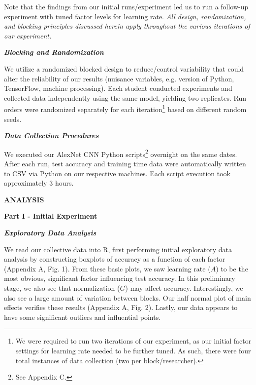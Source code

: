 \documentclass[12pt]{article}
\begin{document}
Note that the findings from our initial runs/experiment led us to run a follow-up experiment with tuned factor levels for learning rate. \textit{All design, randomization, and blocking principles discussed herein apply throughout the various iterations of our experiment.}

\vspace{.5pc}
\noindent \textbf{\textit{Blocking and Randomization}}
\vspace{.1pc}

We utilize a randomized blocked design to reduce/control variability that could alter the reliability of our results (nuisance variables, e.g. version of Python, TensorFlow, machine processing). Each student conducted experiments and collected data independently using the same model, yielding two replicates. Run orders were randomized separately for each iteration\footnote{We were required to run two iterations of our experiment, as our initial factor settings for learning rate needed to be further tuned. As such, there were four total instances of data collection (two per block/researcher). } based on different random seeds. 
 
\vspace{.5pc}
\noindent \textbf{\textit{Data Collection Procedures}}
\vspace{.1pc}

We executed our AlexNet CNN Python scripts\footnote{See Appendix C.} overnight on the same dates. After each run, test accuracy and training time data were automatically written to CSV via Python on our respective machines. Each script execution took approximately 3 hours. 



\vspace{.75pc}
{\noindent \sc \textbf{ANALYSIS}}

\vspace{.5pc}
{\noindent \sc \textbf{Part I - Initial Experiment}}

\vspace{.5pc}
\noindent \textbf{\textit{Exploratory Data Analysis}}
\vspace{.1pc}

We read our collective data into R, first performing initial exploratory data analysis by constructing boxplots of accuracy as a function of each factor (Appendix A, Fig. 1). From these basic plots, we saw learning rate ($A$) to be the most obvious, significant factor influencing test accuracy. In this preliminary stage, we also see that normalization ($G$) may affect accuracy. Interestingly, we also see a large amount of variation between blocks. Our half normal plot of main effects verifies these results (Appendix A, Fig. 2). Lastly, our data appears to have some significant outliers and influential points. 
\end{document}
